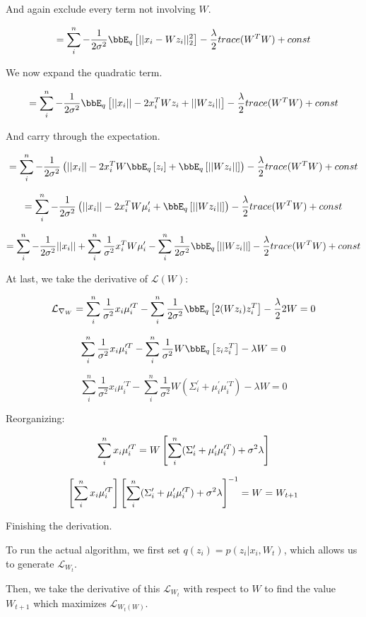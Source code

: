 \documentclass[twoside,11pt]{homework}
\begin{document}
And again exclude every term not involving $W$. 

\[
= \sum_i^n
- \frac{1}{2\sigma^2}
\bbE_q \Brackets{
||x_i - Wz_i||_2^2
}
- \frac{\lambda}{2}trace(W^TW)
+ const
\]

We now expand the quadratic term.

\[
= \sum_i^n
- \frac{1}{2\sigma^2}
\bbE_q \Brackets{
||x_i||
- 2x_i^TWz_i
+ ||Wz_i||
}
- \frac{\lambda}{2}trace(W^TW)
+ const
\]

And carry through the expectation.

\[
= \sum_i^n
- \frac{1}{2\sigma^2}
\Parens{||x_i|| - 2x_i^TW
\bbE_q \Brackets{
z_i
} + \bbE_q \Brackets{
||Wz_i||
}
}
- \frac{\lambda}{2}trace(W^TW)
+ const
\]

\[
= \sum_i^n
- \frac{1}{2\sigma^2}
\Parens{||x_i|| - 2x_i^TW\mu_i^\prime
+ \bbE_q \Brackets{
||Wz_i||
}
}
- \frac{\lambda}{2}trace(W^TW)
+ const
\]

\[
= \sum_i^n
- \frac{1}{2\sigma^2}
||x_i||
+ \sum_i^n
\frac{1}{\sigma^2} x_i^TW\mu_i^\prime
- \sum_i^n
\frac{1}{2\sigma^2} \bbE_q \Brackets{||Wz_i||}
- \frac{\lambda}{2}trace(W^TW)
+ const
\]

At last, we take the derivative of $\mathcal{L}(W)$:

\[
\mathcal{L}_{\nabla_W} =
\sum_i^n
\frac{1}{\sigma^2} x_i\mu_i^{\prime T}
- \sum_i^n
\frac{1}{2\sigma^2} \bbE_q \Brackets{2(Wz_i)z_i^T}
- \frac{\lambda}{2}2W
= 0
\]

\[
\sum_i^n
\frac{1}{\sigma^2} x_i\mu_i^{\prime T}
- \sum_i^n
\frac{1}{\sigma^2}W \bbE_q \Brackets{z_iz_i^T}
- \lambda W
= 0
\]

\[
\sum_i^n
\frac{1}{\sigma^2} x_i\mu_i^{\prime T}
- \sum_i^n
\frac{1}{\sigma^2}W (\Sigma_i^\prime + \mu_i^\prime \mu_i^{\prime T})
- \lambda W
= 0
\]

Reorganizing:

\[
\sum_i^n
x_i\mu_i^{\prime T}
=
W \left[\sum_i^n
(\Sigma_i^\prime + \mu_i^\prime \mu_i^{\prime T})
+ \sigma^2 \lambda
\right]
\]

\[
\left[\sum_i^n 
x_i\mu_i^{\prime T}\right]
\left[\sum_i^n
(\Sigma_i^\prime + \mu_i^\prime \mu_i^{\prime T})
+ \sigma^2 \lambda
\right]^{-1}
= W = 
W_{t+1}
\]

Finishing the derivation.

To run the actual algorithm, we first set $q(z_i) = p(z_i | x_i, W_t)$, which allows us to generate $\mathcal{L}_{W_{t}}$.

Then, we take the derivative of this $\mathcal{L}_{W_{t}}$ with respect to $W$ to find the value $W_{t+1}$ which maximizes $\mathcal{L}_{W_{t}(W)}$.
\end{document}
